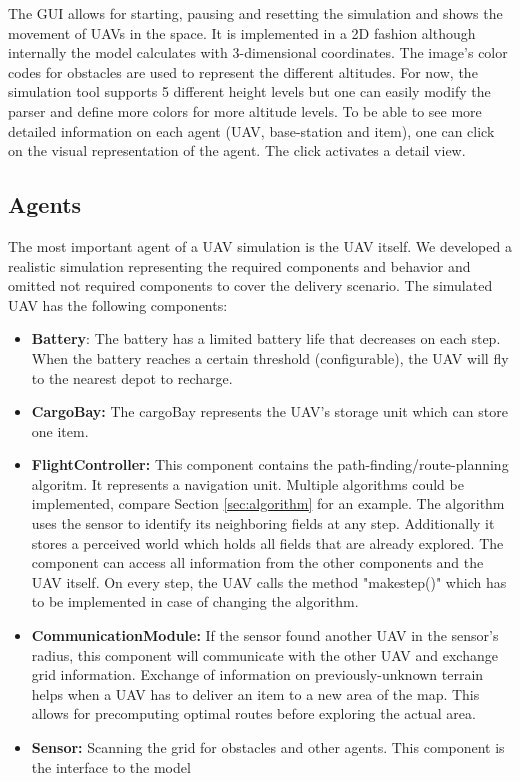 The GUI allows for starting, pausing and resetting the simulation and shows the movement of UAVs in the space. It is implemented in a 2D fashion although internally the model calculates with 3-dimensional coordinates. The image's color codes for obstacles are used to represent the different altitudes. For now, the simulation tool supports 5 different height levels but one can easily modify the parser and define more colors for more altitude levels.
To be able to see more detailed information on each agent (UAV, base-station and item), one can click on the visual representation of the agent. The click activates a detail view. 

\subsection{Agents}\label{sec:UAV}
The most important agent of a UAV simulation is the UAV itself. We developed a realistic simulation representing the required components and behavior and omitted not required components to cover the delivery scenario. The simulated UAV has the following components:
	\begin{itemize}
		\item \textbf{Battery}: The battery has a limited battery life that 
		decreases on each step. When the battery reaches a certain threshold 
		(configurable), the UAV will fly to the nearest depot to recharge.
		\item \textbf{CargoBay:} The cargoBay represents the UAV's storage unit 
		which can store one item.
		\item \textbf{FlightController:} This component contains the 
		path-finding/route-planning algoritm. It represents a navigation unit. 
		Multiple algorithms could be implemented, compare Section 
		\ref{sec:algorithm} for an example. The algorithm uses the sensor to 
		identify its neighboring fields at any step. Additionally it stores a 
		perceived world which holds all fields that are already explored. The 
		component can access all information from the other components and the 
		UAV itself. On every step, the UAV calls the method 
		"make\textunderscore step()" which has to be implemented in case of 
		changing the algorithm.
		\item \textbf{CommunicationModule:} If the sensor found another UAV in 
		the sensor's radius, this component will communicate with the other UAV 
		and exchange grid information. Exchange of information on 
		previously-unknown terrain helps when a UAV has to deliver an item to a 
		new area of the map. This allows for precomputing optimal routes before 
		exploring the actual area.
		\item \textbf{Sensor:} Scanning the grid for obstacles and other 
		agents. This component is the interface to the model
	\end{itemize}

